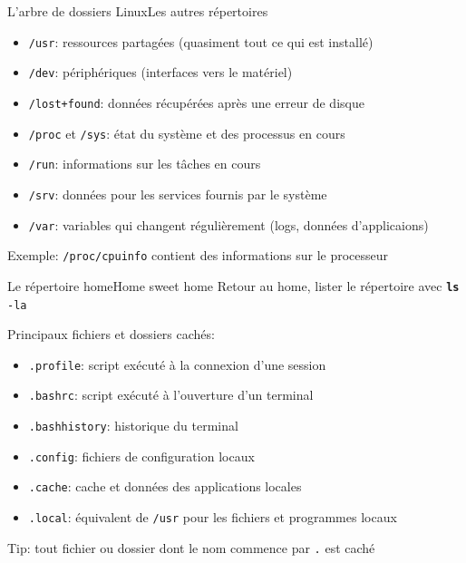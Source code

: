 \documentclass[
aspectratio=169 %
]{beamer}
\begin{document}
\begin{frame}{L'arbre de dossiers Linux}{Les autres répertoires}
    \begin{itemize}
        \item \texttt{/usr}: ressources partagées (quasiment tout ce qui est
              installé)
        \item \texttt{/dev}: périphériques (interfaces vers le matériel)
        \item \texttt{/lost+found}: données récupérées après une erreur de
              disque
        \item \texttt{/proc} et \texttt{/sys}: état du système et des processus
              en cours
        \item \texttt{/run}: informations sur les tâches en cours
        \item \texttt{/srv}: données pour les services fournis par le système
        \item \texttt{/var}: variables qui changent régulièrement
              (logs, données d'applicaions)
    \end{itemize}

    \bigskip
    Exemple: \texttt{/proc/cpuinfo} contient des informations sur le processeur

\end{frame}

\begin{frame}{Le répertoire home}{Home sweet home}
    Retour au home, lister le répertoire avec \texttt{\textbf{ls} -la}
    \bigskip

    Principaux fichiers et dossiers cachés:
    \begin{itemize}
        \item \texttt{.profile}: script exécuté à la connexion d'une session
        \item \texttt{.bashrc}: script exécuté à l'ouverture d'un terminal
        \item \texttt{.bash\textunderscore history}: historique du terminal
        \item \texttt{.config}: fichiers de configuration locaux
        \item \texttt{.cache}: cache et données des applications locales
        \item \texttt{.local}: équivalent de \texttt{/usr} pour les fichiers et
              programmes locaux
    \end{itemize}

    \bigskip
    \alert{Tip:} tout fichier ou dossier dont le nom commence par \texttt{.} est
    caché

\end{frame}
\end{document}
